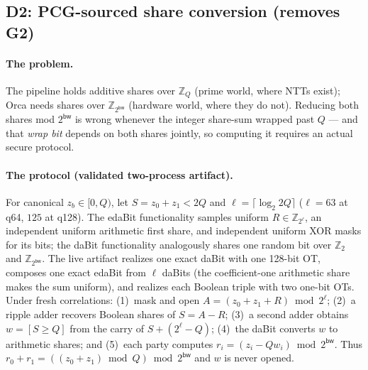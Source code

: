 \documentclass[11pt]{article}
\newcommand{\Z}{\mathbb{Z}}
\newcommand{\bw}{\mathsf{bw}}
\newcommand{\modtwo}{\Z_{2^{\bw}}}
\newcommand{\Q}{Q}   %
\begin{document}
\subsection{D2: PCG-sourced share conversion (removes G2)}
\label{sec:design-convert}

\paragraph{The problem.} The pipeline holds additive shares over $\Z_\Q$
(prime world, where NTTs exist); Orca needs shares over $\modtwo$ (hardware
world, where they do not). Reducing both shares mod $2^{\bw}$ is wrong
whenever the integer share-sum wrapped past $\Q$ --- and that \emph{wrap bit}
depends on both shares jointly, so computing it requires an actual secure
protocol.

\paragraph{The protocol (validated two-process artifact).} For canonical
$z_b\in[0,\Q)$, let $S=z_0+z_1<2\Q$ and
$\ell=\lceil\log_2 2\Q\rceil$ ($\ell{=}63$ at q64, $125$ at q128).
The edaBit functionality samples uniform $R\in\Z_{2^\ell}$, an independent
uniform arithmetic first share, and independent uniform XOR masks for its
bits; the daBit functionality analogously shares one random bit over
$\Z_2$ and $\Z_{2^\bw}$. The live artifact realizes one exact daBit with one
128-bit OT, composes one exact edaBit from $\ell$ daBits (the coefficient-one
arithmetic share makes the sum uniform), and realizes each Boolean triple
with two one-bit OTs. Under fresh correlations: (1)~mask and open
$A=(z_0+z_1+R)\bmod 2^\ell$; (2)~a ripple adder recovers Boolean shares of
$S=A-R$; (3)~a second adder obtains
$w=[S\ge\Q]$ from the carry of $S+(2^\ell-\Q)$; (4)~the daBit converts $w$
to arithmetic shares; and (5)~each party computes
$r_i=(z_i-\Q w_i)\bmod 2^\bw$. Thus
$r_0+r_1=((z_0+z_1)\bmod\Q)\bmod 2^\bw$ and $w$ is never opened.
\end{document}

